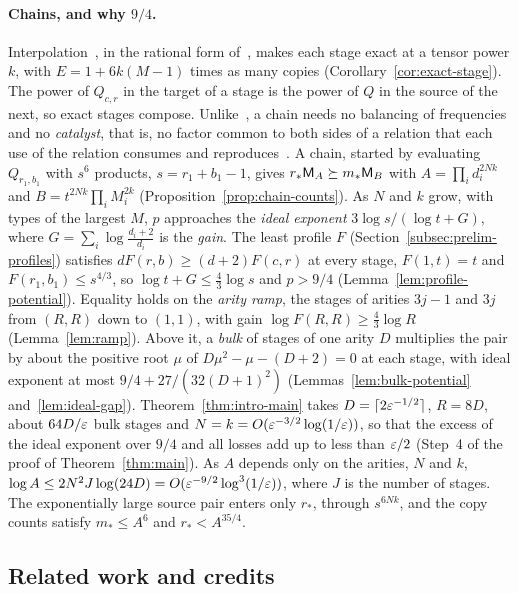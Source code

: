 \paragraph{Chains, and why \(9/4\).}
Interpolation~\citep{Bini80}, in the rational form
of~\citep[Lemmas~2.2 and~9.1(c)]{FinCon26}, makes each stage exact at a
tensor power \(k\), with \(E=1+6k(M-1)\) times as many copies
(Corollary~\ref{cor:exact-stage}). The power of \(Q_{c,r}\) in the
target of a stage is the power of \(Q\) in the source of the next, so
exact stages compose. Unlike~\citep{FinCon26}, a chain needs no
balancing of frequencies and no \emph{catalyst}, that is, no factor
common to both sides of a relation that each use of the relation
consumes and reproduces~\citep[Proposition~7.1]{FinCon26}. A chain, started by evaluating
\(Q_{r_1,b_1}\) with \(s^6\) products, \(s=r_1+b_1-1\), gives \(r_*\mathsf M_A\succeq m_*\mathsf M_B\) with
\(A=\prod_id_i^{2Nk}\) and \(B=t^{2Nk}\prod_iM_i^{2k}\)
(Proposition~\ref{prop:chain-counts}). As \(N\) and \(k\) grow, with
types of the largest \(M\), \(p\) approaches the \emph{ideal exponent} \(3\log s/(\log t+G)\), where
\(G=\sum_i\log\frac{d_i+2}{d_i}\) is the \emph{gain}. The least profile
\(F\) (Section~\ref{subsec:prelim-profiles}) satisfies
\(dF(r,b)\ge(d+2)F(c,r)\) at every stage, \(F(1,t)=t\) and
\(F(r_1,b_1)\le s^{4/3}\), so \(\log t+G\le\frac43\log s\) and \(p>9/4\)
(Lemma~\ref{lem:profile-potential}). Equality holds on the \emph{arity
ramp}, the stages of arities \(3j-1\) and \(3j\) from \((R,R)\) down to
\((1,1)\), with gain \(\log F(R,R)\ge\frac43\log R\)
(Lemma~\ref{lem:ramp}). Above it, a \emph{bulk} of stages of one arity
\(D\) multiplies the pair by about the positive root \(\mu\) of
\(D\mu^2-\mu-(D+2)=0\) at each stage, with ideal exponent at most
\(9/4+27/(32(D+1)^2)\) (Lemmas~\ref{lem:bulk-potential}
and~\ref{lem:ideal-gap}). Theorem~\ref{thm:intro-main} takes
\(D=\lceil2\varepsilon^{-1/2}\rceil\), \(R=8D\), about \(64D/\varepsilon\) bulk stages
and \(N=k=O(\varepsilon^{-3/2}\log(1/\varepsilon))\), so that the excess of the ideal
exponent over \(9/4\) and all losses add up to less than \(\varepsilon/2\) (Step~4 of the proof of Theorem~\ref{thm:main}). As \(A\)
depends only on the arities, \(N\) and \(k\),
\(\log A\le2N^2J\log(24D)=O(\varepsilon^{-9/2}\log^3(1/\varepsilon))\), where \(J\)
is the number of stages. The exponentially large source pair enters
only \(r_*\), through \(s^{6Nk}\), and the copy counts satisfy
\(m_*\le A^6\) and \(r_*<A^{35/4}\).

\subsection{Related work and credits}
\label{subsec:intro-related}

